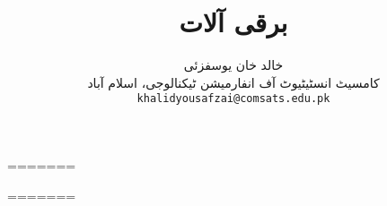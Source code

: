 \documentclass[leqno,b5paper]{book}
\author{
خالد خان یوسفزئی\\
{\small {کامسیٹ انسٹیٹیوٹ آف انفارمیشن ٹیکنالوجی، اسلام آباد}}\\
\texttt{khalidyousafzai@comsats.edu.pk}
}
\title{برقی آلات}
\date{}                           %
\begin{document}
\begin{urdufont}

\renewcommand*{\contentsname}{عنوان}    %

\frontmatter                          %

\maketitle

\tableofcontents
\pagestyle{empty}

%


=======




\mainmatter                      %

\pagestyle{headings}

 












\backmatter

\renewcommand*{\indexname}{فرہنگ}      %
\cleardoublepage
{}
=======
\printindex


\end{urdufont}
\end{document}
